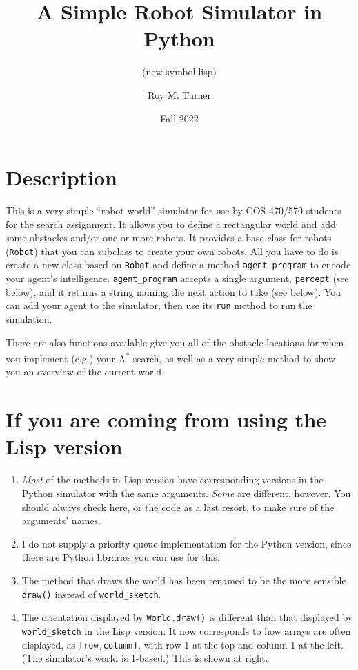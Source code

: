 \documentclass[11pt]{tufte-handout}
\subtitle{(new-symbol.lisp)}
\author{Roy M. Turner}
\date{Fall 2022}
\title{A Simple Robot Simulator in Python}
\begin{document}
\maketitle
\tableofcontents

\titlepage
\maketitle

\section{Description}
\label{sec:orgad546df}

This is a very simple ``robot world''  simulator for use by COS 470/570  students for the search assignment. It allows you to define a rectangular world and add some obstacles and/or one or more robots.  It provides a base class for robots (\texttt{Robot}) that you can subclass to create your own robots.  All you have to do is create a new class based on \texttt{Robot} and define a method \texttt{agent\_program} to encode your agent's intelligence.  \texttt{agent\_program} accepts a single argument, \texttt{percept} (see below), and it returns a string naming the next action to take (see below).  You can add your agent to the simulator, then use its \texttt{run} method to run the simulation.

There are also functions available give you all of the obstacle locations for when you implement (e.g.) your A\textsuperscript{*} search, as well as a very simple method to show you an overview of the current world.

\section{If you are coming from using the Lisp version}
\label{sec:org04b4e7e}

\begin{enumerate}
\item \emph{Most} of the methods in Lisp version have corresponding versions in the Python simulator with the same arguments.  \emph{Some} are different, however.  You should always check here, or the code as a last resort, to make sure of the arguments' names.
\item I do not supply a priority queue implementation for the Python version, since there are Python libraries you can use for this.
\item The method that draws the world has been renamed to be the more sensible \texttt{draw()} instead of \texttt{world\_sketch}.
\item The orientation displayed by \texttt{World.draw()} is different than that displayed by \texttt{world\_sketch} in the Lisp version.  It now corresponds to how arrays are often displayed, as \texttt{[row,column]}, with row 1 at the top and column 1 at the left.  (The simulator's world is 1-based.)   This is shown at right.
\end{enumerate}
\end{document}
